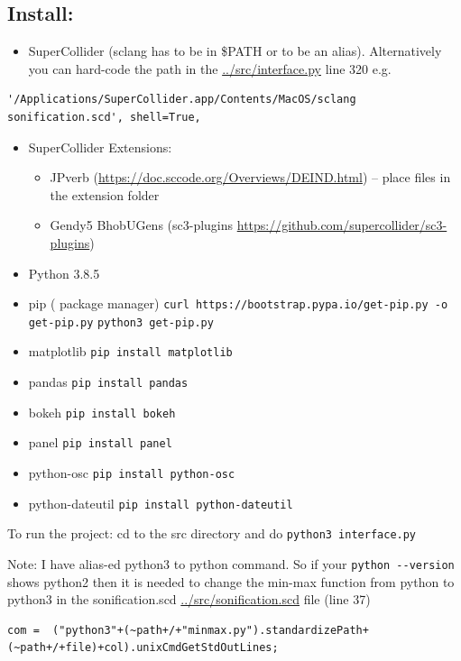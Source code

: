 \documentclass[11pt]{article}
\begin{document}
\subsection{Install:}
\label{sec:org09f3c3f}
\begin{itemize}
\item SuperCollider (sclang has to be in \$PATH or to be an alias).  Alternatively you can hard-code the path in the \url{../src/interface.py} line 320 e.g.
\end{itemize}
\begin{verbatim}
'/Applications/SuperCollider.app/Contents/MacOS/sclang sonification.scd', shell=True,
\end{verbatim}
\begin{itemize}
\item SuperCollider Extensions:
\begin{itemize}
\item JPverb (\url{https://doc.sccode.org/Overviews/DEIND.html}) -- place files in the extension folder
\item Gendy5 BhobUGens (sc3-plugins \url{https://github.com/supercollider/sc3-plugins})
\end{itemize}
\item Python 3.8.5
\item pip ( package manager) \texttt{curl https://bootstrap.pypa.io/get-pip.py -o get-pip.py} \texttt{python3 get-pip.py}
\item matplotlib \texttt{pip install matplotlib}
\item pandas \texttt{pip install pandas}
\item bokeh \texttt{pip install bokeh}
\item panel \texttt{pip install panel}
\item python-osc \texttt{pip install python-osc}
\item python-dateutil \texttt{pip install python-dateutil}
\end{itemize}

To run the project: cd to the src directory and do \texttt{python3 interface.py}

\noindent
Note: I have alias-ed python3 to python command.  So if your \texttt{python -{}-version} shows python2 then it is needed to change the min-max function from python to python3 in the sonification.scd \url{../src/sonification.scd} file (line 37)
\begin{verbatim}
com =  ("python3"+(~path+/+"minmax.py").standardizePath+(~path+/+file)+col).unixCmdGetStdOutLines;
\end{verbatim}
\end{document}
